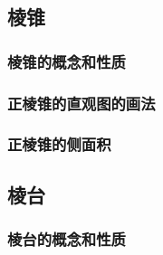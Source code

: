 \subsection{棱锥}
\subsubsection{棱锥的概念和性质}
\begin{Practice}
  \begin{question}
    \item 
    \item 
  \end{question}
\end{Practice}
\subsubsection{正棱锥的直观图的画法}
\subsubsection{正棱锥的侧面积}
\begin{Practice}
  \begin{question}
    \item 
    \item 
  \end{question}
\end{Practice}
\begin{Exercise}
  \begin{question}
    \item 
    \item 
    \item 
    \item 
    \item 
    \item 
    \item 
    \item 
    \item 
    \item 
    \item 
  \end{question}
\end{Exercise}

\subsection{棱台}
\subsubsection{棱台的概念和性质}
\begin{Practice}
  \begin{question}
    \item 
    \item 
  \end{question}
\end{Practice}
